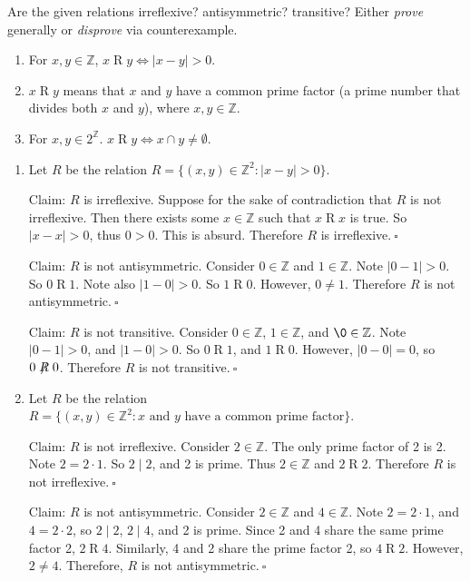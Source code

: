 \documentclass{article}
\newcommand{\Z}{\mathbb{Z}}
\theoremstyle{definition}
\begin{document}
\begin{question}
    Are the given relations irreflexive? antisymmetric? transitive? Either \textit{prove} generally or \textit{disprove} via 
    counterexample.
    	\begin{enumerate}
	\item For $x, y \in \Z$,  $x\mathrel{R}y \iff |x - y| > 0$. 
	\item  $x\mathrel{R}y$ means that $x$ and $y$ have a common prime factor (a prime number that divides both $x$ and $y$), 
	where $x, y \in \Z$.
	\item For $x, y \in 2^{\Z}$. $x\mathrel{R}y \iff x \cap y \neq \emptyset$.
	\end{enumerate}
\end{question}
\begin{solution}
\begin{enumerate}
\item Let $R$ be the relation $R=\{(x,y)\in\Z^2:|x-y|>0\}$.

Claim: $R$ is irreflexive. Suppose for the sake of contradiction that $R$ is not irreflexive. Then there exists some $x\in\Z$ such that $x\mathrel{R}x$ is true. So $|x-x|>0$, thus $0>0$. This is absurd. Therefore $R$ is irreflexive.$~\square$

Claim: $R$ is not antisymmetric. Consider $0\in\Z$ and $1\in\Z$. Note $|0-1|>0$. So $0\mathrel{R}1$. Note also $|1-0|>0$. So $1\mathrel{R}0$. However, $0\neq 1$. Therefore $R$ is not antisymmetric.$~\square$

Claim: $R$ is not transitive. Consider $0\in\Z$, $1\in\Z$, and $\0\in\Z$. Note $|0-1|>0$, and $|1-0|>0$. So $0\mathrel{R}1$, and $1\mathrel{R}0$. However, $|0-0|=0$, so $0\not\mathrel{R}0$. Therefore $R$ is not transitive.$~\square$
\item Let $R$ be the relation $R=\{(x,y)\in\Z^2:x\text{ and }y\text{ have a common prime factor}\}$.

Claim: $R$ is not irreflexive. Consider $2\in\Z$. The only prime factor of 2 is 2. Note $2=2\cdot 1$. So $2\mid 2$, and 2 is prime. Thus $2\in\Z$ and $2\mathrel{R}2$. Therefore $R$ is not irreflexive.$~\square$ 

Claim: $R$ is not antisymmetric. Consider $2\in\Z$ and $4\in\Z$. Note $2=2\cdot 1$, and $4=2\cdot 2$, so $2\mid 2$, $2\mid 4$, and 2 is prime. Since 2 and 4 share the same prime factor 2, $2\mathrel{R}4$. Similarly, 4 and 2 share the prime factor 2, so $4\mathrel{R}2$. However, $2\neq 4$. Therefore, $R$ is not antisymmetric.$~\square$


\end{enumerate}
\end{solution}
\end{document}
